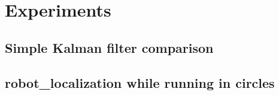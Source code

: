 \chapter{Experiments}\label{cha:experiments}
\pagestyle{scrheadings}

\section{Simple Kalman filter comparison}\label{sec:exp1}

\section{robot_localization while running in circles}\label{sec:exp2}

